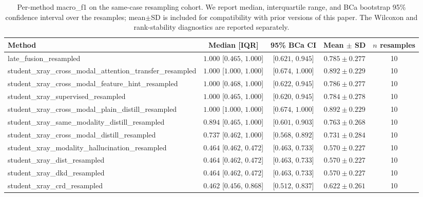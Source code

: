 \begin{table}[t]
\caption{Per-method macro_f1 on the same-case resampling cohort. We report median, interquartile range, and BCa bootstrap 95\% confidence interval over the resamples; mean$\pm$SD is included for compatibility with prior versions of this paper. The Wilcoxon and rank-stability diagnostics are reported separately.}
\label{tab:macro_f1_resampling_stats}
\centering
\begin{tabular}{|l|c|c|c|c|}
\hline
Method & Median [IQR] & 95\% BCa CI & Mean $\pm$ SD & $n$ resamples \\ \hline
late_fusion_resampled & $1.000$ [$0.465$, $1.000$] & [$0.621$, $0.945$] & $0.785 \pm 0.277$ & 10 \\ \hline
student_xray_cross_modal_attention_transfer_resampled & $1.000$ [$1.000$, $1.000$] & [$0.674$, $1.000$] & $0.892 \pm 0.229$ & 10 \\ \hline
student_xray_cross_modal_feature_hint_resampled & $1.000$ [$0.468$, $1.000$] & [$0.622$, $0.945$] & $0.786 \pm 0.277$ & 10 \\ \hline
student_xray_supervised_resampled & $1.000$ [$0.465$, $1.000$] & [$0.620$, $0.945$] & $0.784 \pm 0.278$ & 10 \\ \hline
student_xray_cross_modal_plain_distill_resampled & $1.000$ [$1.000$, $1.000$] & [$0.674$, $1.000$] & $0.892 \pm 0.229$ & 10 \\ \hline
student_xray_same_modality_distill_resampled & $0.894$ [$0.465$, $1.000$] & [$0.601$, $0.903$] & $0.763 \pm 0.268$ & 10 \\ \hline
student_xray_cross_modal_distill_resampled & $0.737$ [$0.462$, $1.000$] & [$0.568$, $0.892$] & $0.731 \pm 0.284$ & 10 \\ \hline
student_xray_modality_hallucination_resampled & $0.464$ [$0.462$, $0.472$] & [$0.463$, $0.733$] & $0.570 \pm 0.227$ & 10 \\ \hline
student_xray_dist_resampled & $0.464$ [$0.462$, $0.472$] & [$0.463$, $0.733$] & $0.570 \pm 0.227$ & 10 \\ \hline
student_xray_dkd_resampled & $0.464$ [$0.462$, $0.472$] & [$0.463$, $0.733$] & $0.570 \pm 0.227$ & 10 \\ \hline
student_xray_crd_resampled & $0.462$ [$0.456$, $0.868$] & [$0.512$, $0.837$] & $0.622 \pm 0.261$ & 10 \\ \hline
\end{tabular}
\end{table}